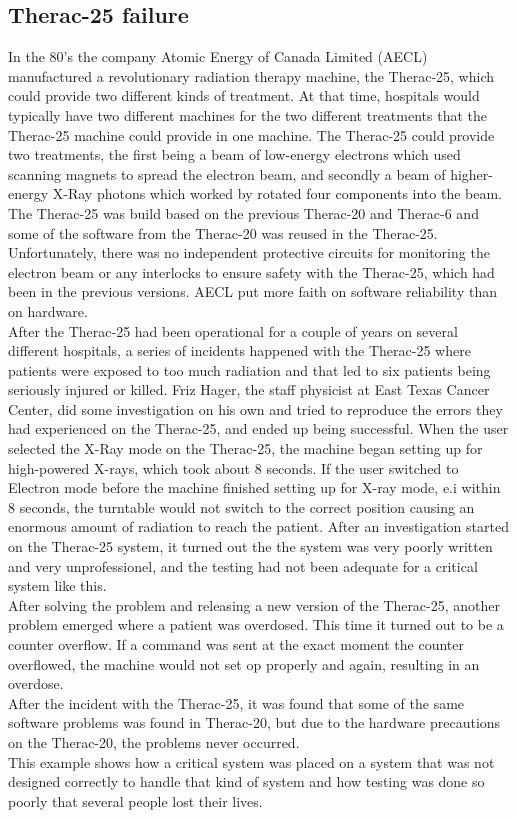 \documentclass[a4paper]{report}
\begin{document}
\subsection{Therac-25 failure}
In the 80's the company Atomic Energy of Canada Limited (AECL) manufactured a revolutionary radiation therapy machine, the Therac-25\cite{Leveson1993}, which could provide two different kinds of treatment. At that time, hospitals would typically have two different machines for the two different treatments that the Therac-25 machine could provide in one machine. The Therac-25 could provide two treatments, the first being a beam of low-energy electrons which used scanning magnets to spread the electron beam, and secondly a beam of higher-energy X-Ray photons which worked by rotated four components into the beam. The Therac-25 was build based on the previous Therac-20 and Therac-6 and some of the software from the Therac-20 was reused in the Therac-25. Unfortunately, there was no independent protective circuits for monitoring the electron beam or any interlocks to ensure safety with the Therac-25, which had been in the previous versions. AECL put more faith on software reliability than on hardware. \\ After the Therac-25 had been operational for a couple of years on several different hospitals, a series of incidents happened with the Therac-25 where patients were exposed to too much radiation and that led to six patients being seriously injured or killed. Friz Hager, the staff physicist at East Texas Cancer Center, did some investigation on his own and tried to reproduce the errors they had experienced on the Therac-25, and ended up being successful. When the user selected the X-Ray mode on the Therac-25, the machine began setting up for high-powered X-rays, which took about 8 seconds. If the user switched to Electron mode before the machine finished setting up for X-ray mode, e.i within 8 seconds, the turntable would not switch to the correct position causing an enormous amount of radiation to reach the patient. 
After an investigation started on the Therac-25 system, it turned out the the system was very poorly written and very unprofessionel, and the testing had not been adequate for a critical system like this. \\ After solving the problem and releasing a new version of the Therac-25, another problem emerged where a patient was overdosed. This time it turned out to be a counter overflow. If a command was sent at the exact moment the counter overflowed, the machine would not set op properly and again, resulting in an overdose. \\
After the incident with the Therac-25, it was found that some of the same software problems was found in Therac-20, but due to the hardware precautions on the Therac-20, the problems never occurred. 
\\ This example shows how a critical system was placed on a system that was not designed correctly to handle that kind of system and how testing was done so poorly that several people lost their lives.
\end{document}
